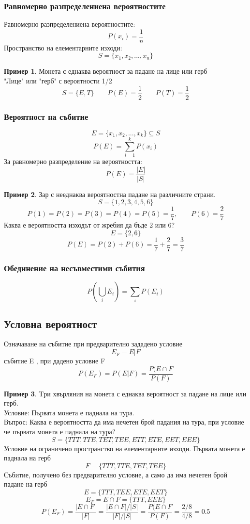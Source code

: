 \documentclass[fleqn, 12pt]{article}
\theoremstyle{definition}
\newtheorem{example}{Пример}[subsection]
\begin{document}
\subsubsection{Равномерно разпределениена вероятностите}
Равномерно разпределениена вероятностите:
$$P(x_i) = \frac{1}{n}$$
Пространство на елементарните изходи:
$$S = \{x_1, x_2, ..., x_n \}$$

\begin{example}
Монета с еднаква вероятност за падане на лице или герб \\
"Лице" или "герб" с вероятности 1/2
$$S = \{ E,T \} \qquad P(E) = \frac{1}{2} \qquad P(T) = \frac{1}{2} $$
\end{example}

\subsubsection{Вероятност на събитие}
$$E = \{x_1, x_2, ..., x_k \} \subseteq S$$
$$P(E) = \sum_{i=1}^k P(x_i)$$
За равномерно разпределение на вероятността: 
$$P(E) = \frac{|E|}{|S|}$$

\begin{example}
Зар с нееднаква вероятностна падане на различните страни.
$$S = \{1,2,3,4,5,6 \}$$
$$P(1) = P(2) = P(3) = P(4) = P(5) = \frac{1}{7}, \qquad P(6) = \frac{2}{7}$$
Каква е вероятността изходът от жребия да бъде 2 или 6?\\
$$E = \{2,6\}$$
$$P(E) = P(2) +P(6) = \frac{1}{7} + \frac{2}{7} = \frac{3}{7}$$
\end{example}

\subsubsection{Обединение на несъвместими събития}
$$P\left( \bigcup_i E_i \right) = \sum_i P(E_i)$$

\subsection{Условна вероятност}
Означаване на събитие при предварително зададено условие
$$E_F = E \vert F$$
събитие E , при дадено условие F
$$P(E_F) = P(E \vert F) = \frac{P(E \cap F}{P(F)}$$

\begin{example}
Tри хвърляния на монета с еднаква вероятност за падане на лице или герб. \\
Условие: Първата монета е паднала на тура.\\
Въпрос: Каква е вероятността да има нечетен брой падания на тура, при условие че първата монета е паднала на тура? \\
$$S = \{TTT, TTE,TET, TEE, ETT, ETE, EET, EEE \}$$
Условие на ограничено пространство на елементарните изходи. Първата монета е паднала на герб
$$F = \{TTT,TTE,TET,TEE \}$$
Събитие, получено без предварително условие, а само да има нечетен брой падане на герб
$$E = \{ TTT, TEE, ETE, EET\}$$
$$E_F = E \cap F = \{TTT, EEE \}$$
$$P(E_F) = \frac{|E \cap F|}{|F|} = \frac{|E \cap F|/ |S|}{|F|/|S|} = \frac{P(E \cap F}{P(F)} = \frac{2/8}{4/8} = 0.5$$
\end{example}
\end{document}
